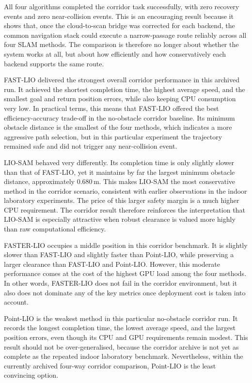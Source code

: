 \documentclass[12pt,a4paper]{report}
\begin{document}
All four algorithms completed the corridor task successfully, with zero recovery events and zero near-collision events. This is an encouraging result because it shows that, once the cloud-to-scan bridge was corrected for each backend, the common navigation stack could execute a narrow-passage route reliably across all four SLAM methods. The comparison is therefore no longer about whether the system works at all, but about how efficiently and how conservatively each backend supports the same route.

FAST-LIO delivered the strongest overall corridor performance in this archived run. It achieved the shortest completion time, the highest average speed, and the smallest goal and return position errors, while also keeping CPU consumption very low. In practical terms, this means that FAST-LIO offered the best efficiency-accuracy trade-off in the no-obstacle corridor baseline. Its minimum obstacle distance is the smallest of the four methods, which indicates a more aggressive path selection, but in this particular experiment the trajectory remained safe and did not trigger any near-collision event.

LIO-SAM behaved very differently. Its completion time is only slightly slower than that of FAST-LIO, yet it maintains by far the largest minimum obstacle distance, approximately \(0.680\,\mathrm{m}\). This makes LIO-SAM the most conservative method in the corridor scenario, consistent with earlier observations in the indoor laboratory experiments. The price of this larger safety margin is a much higher CPU requirement. The corridor result therefore reinforces the interpretation that LIO-SAM is especially attractive when robust clearance is valued more highly than raw computational efficiency.

FASTER-LIO occupies a middle position in this corridor benchmark. It is slightly slower than FAST-LIO and slightly faster than Point-LIO, while preserving a larger clearance than FAST-LIO and Point-LIO. However, this moderate performance comes at the cost of the highest GPU load among the four methods. In other words, FASTER-LIO does not fail in the corridor environment, but it also does not dominate any of the key metrics once deployment cost is taken into account.

Point-LIO is the weakest method in this particular no-obstacle corridor run. It records the longest completion time, the lowest average speed, and the largest position errors, even though its CPU and GPU requirements remain modest. This result should not be over-generalised, because the corridor archive is not yet as complete as the repeated indoor laboratory benchmark. Nevertheless, within the currently archived four-way corridor comparison, Point-LIO is the least convincing option.
\end{document}
